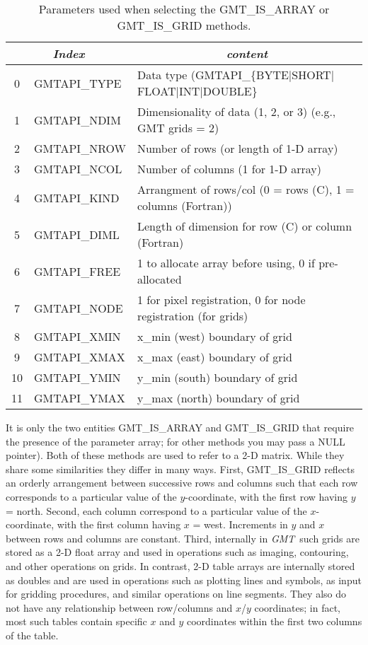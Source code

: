 \documentclass{report}
\newcommand{\GMT}{\textit{GMT}}%
\newcommand{\GMT}{\htmladdnormallink{\texttt{[image: eps/GMT\_glyph10.eps]}}{http://gmt.soest.hawaii.edu}}%
\newcommand{\GMT}{\htmladdnormallink{\textbf{GMT}}{http://gmt.soest.hawaii.edu}}%
\begin{document}
\begin{table}[h]
\small
\centering
\begin{tabular}{|c|l|l|} \hline
\multicolumn{2}{|c|}{\emph{Index}} & \multicolumn{1}{c|}{\emph{content}} \\ \hline
0 & GMTAPI\_TYPE	&       Data type (GMTAPI\_\{BYTE$|$SHORT$|$FLOAT$|$INT$|$DOUBLE\} \\ \hline
1 & GMTAPI\_NDIM	&       Dimensionality of data (1, 2, or 3) (e.g., GMT grids = 2)  \\ \hline
2 & GMTAPI\_NROW	&       Number of rows (or length of 1-D array) \\ \hline
3 & GMTAPI\_NCOL	&       Number of columns (1 for 1-D array) \\ \hline
4 & GMTAPI\_KIND	&       Arrangment of rows/col (0 = rows (C), 1 = columns (Fortran))  \\ \hline
5 & GMTAPI\_DIML	&       Length of dimension for row (C) or column (Fortran)  \\ \hline
6 & GMTAPI\_FREE	&       1 to allocate array before using, 0 if pre-allocated  \\ \hline \hline
7 & GMTAPI\_NODE	&       1 for pixel registration, 0 for node registration (for grids)  \\ \hline
8 & GMTAPI\_XMIN	&       x\_min (west) boundary of grid  \\ \hline
9 & GMTAPI\_XMAX	&       x\_max (east) boundary of grid  \\ \hline
10 & GMTAPI\_YMIN	&       y\_min (south) boundary of grid  \\ \hline
11 & GMTAPI\_YMAX	&       y\_max (north) boundary of grid  \\ \hline
\end{tabular}
\caption{Parameters used when selecting the GMT\_IS\_ARRAY or GMT\_IS\_GRID methods.}
\label{tbl:pars}
\end{table}

It is only the two entities GMT\_IS\_ARRAY and GMT\_IS\_GRID that require the presence of
the parameter array; for other methods you may pass a NULL pointer).  Both of these
methods are used to refer to a 2-D matrix.  While they share some similarities
they differ in many ways.  First, GMT\_IS\_GRID reflects an orderly arrangement between
successive rows and columns such that each row corresponds to a particular value of the $y$-coordinate,
with the first row having $y$ = north.  Second, each column correspond to a particular value
of the $x$-coordinate, with the first column having $x$ = west. Increments in $y$ and $x$ 
between rows and columns are constant. Third, internally in \GMT\ such grids are stored as
a 2-D float array and used in operations such as imaging, contouring, and other operations
on grids.  In contrast, 2-D table arrays are internally stored as doubles and are used in
operations such as plotting lines and symbols, as input for gridding procedures, and similar
operations on line segments.  They also do not have any relationship between row/columns and $x$/$y$ coordinates;
in fact, most such tables contain specific $x$ and $y$ coordinates within the first two
columns of the table.
\end{document}
